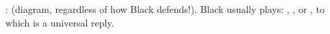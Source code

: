 :  (diagram, regardless of how Black defends!).
Black usually plays: , ,  or , to which  is a universal reply.

